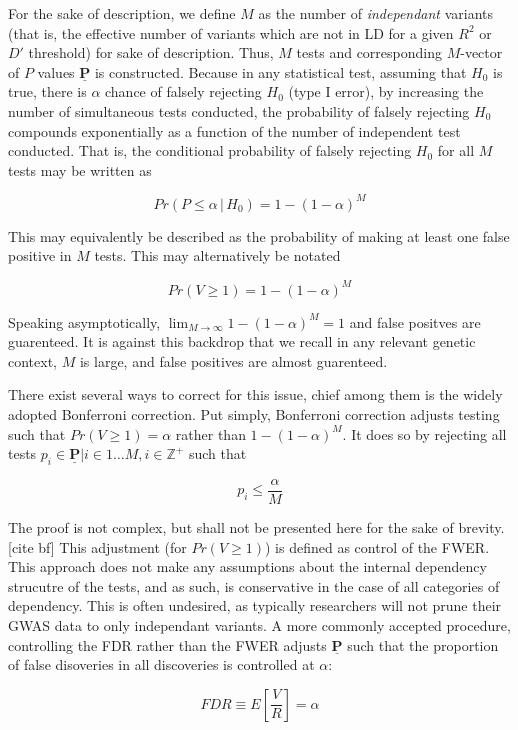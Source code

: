 For the sake of description, we define $M$ as the number of \textit{independant} variants (that is, the effective number of variants which are not in \ac{LD} for a given $R^2$ or $D'$ threshold) for sake of description. Thus, $M$ tests and corresponding $M$-vector of $P$ values $\underline{\mathbf{P}}$ is constructed. Because in any statistical test, assuming that $H_0$ is true, there is $\alpha$ chance of falsely rejecting $H_0$ (type I error), by increasing the number of simultaneous tests conducted, the probability of falsely rejecting $H_0$ compounds exponentially as a function of the number of independent test conducted. That is, the conditional probability of falsely rejecting $H_0$ for all $M$ tests may be written as 

$$ Pr(P \leq \alpha \, | \, H_0) = 1-(1 - \alpha)^M $$

This may equivalently be described as the probability of making at least one false positive in $M$ tests. This may alternatively be notated 

$$ Pr(V \geq 1) = 1-(1 - \alpha)^M $$

Speaking asymptotically, $\lim_{M \to \infty} 1-(1 - \alpha)^M = 1$ and false positves are guarenteed. It is against this backdrop that we recall in any relevant genetic context, $M$ is large, and false positives are almost guarenteed.

There exist several ways to correct for this issue, chief among them is the widely adopted Bonferroni correction. Put simply, Bonferroni correction adjusts testing such that $Pr(V \geq 1) = \alpha$ rather than $1-(1 - \alpha)^M$. It does so by rejecting all tests $p_i \in \underline{\mathbf{P}} | i \in 1 \dots M, i \in \mathbb{Z}^+$ such that

$$ p_i \leq \frac{\alpha}{M} $$


The proof is not complex, but shall not be presented here for the sake of brevity. [cite bf]  This adjustment (for $Pr(V \geq 1)$) is defined as control of the \ac{FWER}. This approach does not make any assumptions about the internal dependency strucutre of the tests, and as such, is conservative in the case of all categories of dependency. This is often undesired, as typically researchers will not prune their \ac{GWAS} data to only independant variants. A more commonly accepted procedure, controlling the \ac{FDR} rather than the \ac{FWER} adjusts $\underline{\mathbf{P}}$ such that the proportion of false disoveries in all discoveries is controlled at $\alpha$: 

$$ FDR \equiv E \left[ \frac{V}{R} \right] = \alpha $$

